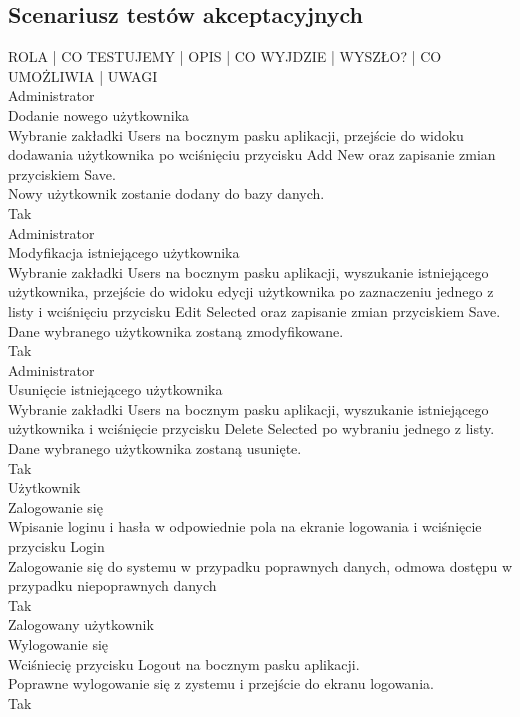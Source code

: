 \documentclass[10pt,a4paper]{article}
\begin{document}
\subsection{Scenariusz testów akceptacyjnych}
ROLA | CO TESTUJEMY | OPIS | CO WYJDZIE | WYSZŁO? | CO UMOŻLIWIA | UWAGI\\

Administrator\\
Dodanie nowego użytkownika\\
Wybranie zakładki Users na bocznym pasku aplikacji, przejście do widoku dodawania użytkownika po wciśnięciu przycisku Add New oraz zapisanie zmian przyciskiem Save.\\
Nowy użytkownik zostanie dodany do bazy danych.\\
Tak\\

Administrator\\
Modyfikacja istniejącego użytkownika\\
Wybranie zakładki Users na bocznym pasku aplikacji, wyszukanie istniejącego użytkownika, przejście do widoku edycji użytkownika po zaznaczeniu jednego z listy i wciśnięciu przycisku Edit Selected oraz zapisanie zmian przyciskiem Save.\\
Dane wybranego użytkownika zostaną zmodyfikowane.\\
Tak\\

Administrator\\
Usunięcie istniejącego użytkownika\\
Wybranie zakładki Users na bocznym pasku aplikacji, wyszukanie istniejącego użytkownika i wciśnięcie przycisku Delete Selected po wybraniu jednego z listy.\\
Dane wybranego użytkownika zostaną usunięte.\\
Tak\\

Użytkownik\\
Zalogowanie się\\
Wpisanie loginu i hasła w odpowiednie pola na ekranie logowania i wciśnięcie przycisku Login\\
Zalogowanie się do systemu w przypadku poprawnych danych, odmowa dostępu w przypadku niepoprawnych danych\\
Tak\\

Zalogowany użytkownik\\
Wylogowanie się\\
Wciśniecię przycisku Logout na bocznym pasku aplikacji.\\
Poprawne wylogowanie się z zystemu i przejście do ekranu logowania.\\
Tak\\
\end{document}
